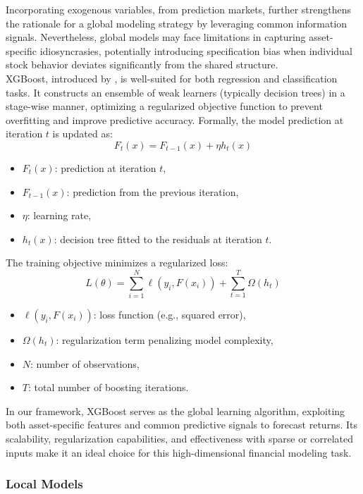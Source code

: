 \documentclass[12pt]{report}
\begin{document}
Incorporating exogenous variables, from prediction markets, further strengthens the rationale for a global modeling strategy by leveraging common information signals. Nevertheless, global models may face limitations in capturing asset-specific idiosyncrasies, potentially introducing specification bias when individual stock behavior deviates significantly from the shared structure.\\

XGBoost, introduced by \cite{chen_xgboost_2016}, is well-suited for both regression and classification tasks. It constructs an ensemble of weak learners (typically decision trees) in a stage-wise manner, optimizing a regularized objective function to prevent overfitting and improve predictive accuracy. Formally, the model prediction at iteration \( t \) is updated as:
\[
F_t(x) = F_{t-1}(x) + \eta h_t(x)
\]
\begin{itemize}
  \item \( F_t(x) \): prediction at iteration \( t \),
  \item \( F_{t-1}(x) \): prediction from the previous iteration,
  \item \( \eta \): learning rate,
  \item \( h_t(x) \): decision tree fitted to the residuals at iteration \( t \).
\end{itemize}

The training objective minimizes a regularized loss:
\[
L(\theta) = \sum_{i=1}^{N} \ell(y_i, F(x_i)) + \sum_{t=1}^{T} \Omega(h_t)
\]
\begin{itemize}
  \item \( \ell(y_i, F(x_i)) \): loss function (e.g., squared error),
  \item \( \Omega(h_t) \): regularization term penalizing model complexity,
  \item \( N \): number of observations,
  \item \( T \): total number of boosting iterations.
\end{itemize}

In our framework, XGBoost serves as the global learning algorithm, exploiting both asset-specific features and common predictive signals to forecast returns. Its scalability, regularization capabilities, and effectiveness with sparse or correlated inputs make it an ideal choice for this high-dimensional financial modeling task.


\subsubsection{Local Models}
\end{document}
